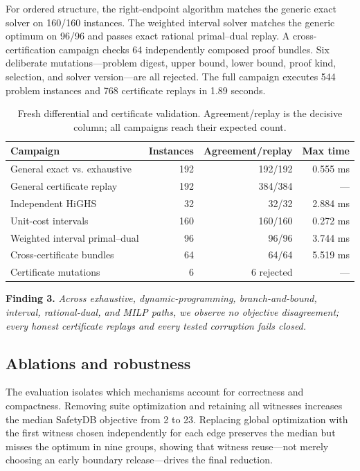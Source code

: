 \documentclass[10pt,conference]{IEEEtran}
\newcommand{\tblfont}{\footnotesize}
\begin{document}
For ordered structure, the right-endpoint algorithm matches the generic exact solver on 160/160 instances. The weighted interval solver matches the generic optimum on 96/96 and passes exact rational primal--dual replay. A cross-certification campaign checks 64 independently composed proof bundles. Six deliberate mutations---problem digest, upper bound, lower bound, proof kind, selection, and solver version---are all rejected. The full campaign executes 544 problem instances and 768 certificate replays in 1.89 seconds.

\begin{table}[t]
\centering
\caption{Fresh differential and certificate validation. Agreement/replay is the decisive column; all campaigns reach their expected count.}
\label{tab:validation}
{\tblfont
\begin{tabularx}{\columnwidth}{@{}Yrrr@{}}
\toprule
Campaign & Instances & Agreement/replay & Max time \\
\midrule
General exact vs. exhaustive & 192 & 192/192 & 0.555 ms \\
General certificate replay & 192 & 384/384 & --- \\
Independent HiGHS & 32 & 32/32 & 2.884 ms \\
Unit-cost intervals & 160 & 160/160 & 0.272 ms \\
Weighted interval primal--dual & 96 & 96/96 & 3.744 ms \\
Cross-certificate bundles & 64 & 64/64 & 5.519 ms \\
Certificate mutations & 6 & 6 rejected & --- \\
\bottomrule
\end{tabularx}}
\end{table}

\textbf{Finding 3.} \emph{Across exhaustive, dynamic-programming, branch-and-bound, interval, rational-dual, and MILP paths, we observe no objective disagreement; every honest certificate replays and every tested corruption fails closed.}


\subsection{Ablations and robustness}
The evaluation isolates which mechanisms account for correctness and compactness. Removing suite optimization and retaining all witnesses increases the median SafetyDB objective from 2 to 23. Replacing global optimization with the first witness chosen independently for each edge preserves the median but misses the optimum in nine groups, showing that witness reuse---not merely choosing an early boundary release---drives the final reduction.
\end{document}
